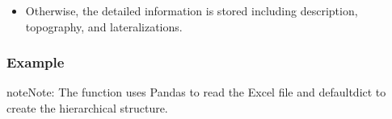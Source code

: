 \documentclass[letterpaper,10pt,english]{sphinxmanual}
\begin{document}
\begin{fulllineitems}
\begin{description}
\begin{itemize}
\item {} 
\sphinxAtStartPar
Otherwise, the detailed information is stored including description, topography, and lateralizations.

\end{itemize}

\end{description}
\subsubsection*{Example}

\begin{sphinxVerbatim}[commandchars=\\\{\}]
\end{sphinxVerbatim}

\begin{sphinxadmonition}{note}{Note:}
\sphinxAtStartPar
The function uses Pandas to read the Excel file and defaultdict
to create the hierarchical structure.
\end{sphinxadmonition}

\end{fulllineitems}

\end{document}

